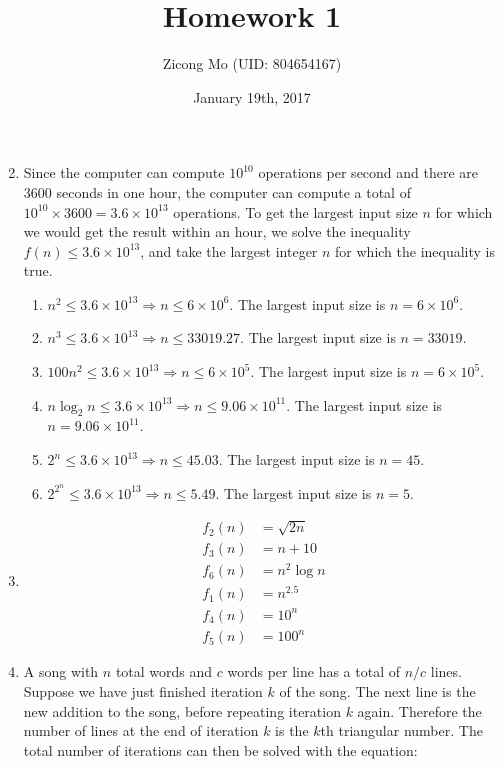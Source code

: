 \documentclass[12 pt, oneside]{article}
\title{Homework 1}
\author{Zicong Mo (UID: 804654167)}
\date{January 19th, 2017}
\begin{document}
\maketitle
\begin{enumerate}
\setcounter{enumi}{1}
\item 
Since the computer can compute $10^{10}$ operations per second and there are 3600 seconds in one hour, the computer can compute a total of $10^{10} \times 3600 = 3.6 \times 10^{13}$ operations. To get the largest input size $n$ for which we would get the result within an hour, we solve the inequality $f(n) \le 3.6 \times 10^{13}$, and take the largest integer $n$ for which the inequality is true.
\begin{enumerate}
\item $n^2 \le 3.6 \times 10^{13} \Rightarrow n \le 6 \times 10^6$. The largest input size is $n = 6 \times 10^6$.
\item $n^3 \le 3.6 \times 10^{13} \Rightarrow n \le 33019.27$. The largest input size is $n = 33019$.
\item $100 n^2 \le 3.6 \times 10^{13} \Rightarrow n \le 6 \times 10^5$. The largest input size is $n = 6 \times 10^5$.
\item $n \log_2 n \le 3.6 \times 10^{13} \Rightarrow n \le 9.06 \times 10^{11}$. The largest input size is $n = 9.06 \times 10^{11}$.
\item $2^n \le 3.6 \times 10^{13} \Rightarrow n \le 45.03$. The largest input size is $n = 45$.
\item $2^{2^n} \le 3.6 \times 10^{13} \Rightarrow n \le 5.49$. The largest input size is $n = 5$. 
\end{enumerate}
\clearpage
\item
\begin{align*}
f_2(n) &= \sqrt{2n} \\
f_3(n) &= n + 10 \\
f_6(n) &= n^2 \log n \\
f_1(n) &= n^{2.5} \\
f_4(n) &= 10^n \\
f_5(n) &= 100^n
\end{align*}
\clearpage
\setcounter{enumi}{6}
\item 
A song with $n$ total words and $c$ words per line has a total of $n/c$ lines. Suppose we have just finished iteration $k$ of the song. The next line is the new addition to the song, before repeating iteration $k$ again.  Therefore the number of lines at the end of iteration $k$ is the $k$th triangular number. The total number of iterations can then be solved with the equation:

\end{enumerate}
\end{document}
